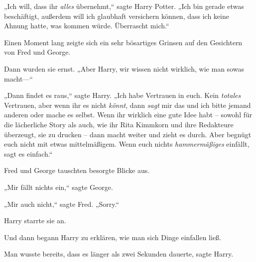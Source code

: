 „Ich will, dass ihr \emph{alles} übernehmt,“ sagte Harry Potter. „Ich bin gerade etwas beschäftigt, außerdem will ich glaubhaft versichern können, dass ich keine Ahnung hatte, was kommen würde. Überrascht mich.“

Einen Moment lang zeigte sich ein sehr bösartiges Grinsen auf den Gesichtern von Fred und George.

Dann wurden sie ernst. „Aber Harry, wir wissen nicht wirklich, wie man sowas macht—“

„Dann findet es raus,“ sagte Harry. „Ich habe Vertrauen in euch. Kein \emph{totales} Vertrauen, aber wenn ihr es nicht \emph{könnt}, dann \emph{sagt} mir das und ich bitte jemand anderen oder mache es selbst. Wenn ihr wirklich eine gute Idee habt -- sowohl für die lächerliche Story als auch, wie ihr Rita Kimmkorn und ihre Redakteure überzeugt, sie zu drucken -- dann macht weiter und zieht es durch. Aber begnügt euch nicht mit etwas mittelmäßigem. Wenn euch nichts \emph{hammermäßiges} einfällt, sagt es einfach.“

Fred und George tauschten besorgte Blicke aus.

„Mir fällt nichts ein,“ sagte George.

„Mir auch nicht,“ sagte Fred. „Sorry.“

Harry starrte sie an.

Und dann begann Harry zu erklären, wie man sich Dinge einfallen ließ.

Man wusste bereits, dass es länger als zwei Sekunden dauerte, sagte Harry.

